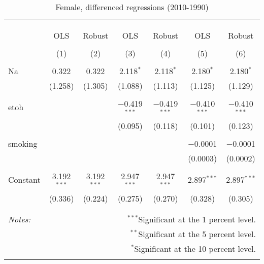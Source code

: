 \documentclass[11pt]{article}\usepackage[]{graphicx}\usepackage[]{color}
\begin{document}
\begin{table}[!htbp] \centering 
  \caption{Female, differenced regressions (2010-1990)} 
  \label{tab:flm} 
\begin{tabular}{@{\extracolsep{5pt}}lcccccc} 
\\[-1.8ex]\hline 
\hline \\[-1.8ex] 
\\[-1.8ex] & \multicolumn{6}{c}{ } \\ 
 & OLS & Robust & OLS & Robust & OLS & Robust \\ 
\\[-1.8ex] & (1) & (2) & (3) & (4) & (5) & (6)\\ 
\hline \\[-1.8ex] 
 Na & 0.322 & 0.322 & 2.118$^{*}$ & 2.118$^{*}$ & 2.180$^{*}$ & 2.180$^{*}$ \\ 
  & (1.258) & (1.305) & (1.088) & (1.113) & (1.125) & (1.129) \\ 
  & & & & & & \\ 
 etoh &  &  & $-$0.419$^{***}$ & $-$0.419$^{***}$ & $-$0.410$^{***}$ & $-$0.410$^{***}$ \\ 
  &  &  & (0.095) & (0.118) & (0.101) & (0.123) \\ 
  & & & & & & \\ 
 smoking &  &  &  &  & $-$0.0001 & $-$0.0001 \\ 
  &  &  &  &  & (0.0003) & (0.0002) \\ 
  & & & & & & \\ 
 Constant & 3.192$^{***}$ & 3.192$^{***}$ & 2.947$^{***}$ & 2.947$^{***}$ & 2.897$^{***}$ & 2.897$^{***}$ \\ 
  & (0.336) & (0.224) & (0.275) & (0.270) & (0.328) & (0.305) \\ 
  & & & & & & \\ 
\hline 
\hline \\[-1.8ex] 
\textit{Notes:} & \multicolumn{6}{r}{$^{***}$Significant at the 1 percent level.} \\ 
 & \multicolumn{6}{r}{$^{**}$Significant at the 5 percent level.} \\ 
 & \multicolumn{6}{r}{$^{*}$Significant at the 10 percent level.} \\ 
 & \multicolumn{6}{r}{} \\ 
\end{tabular} 
\end{table} 
\end{document}
